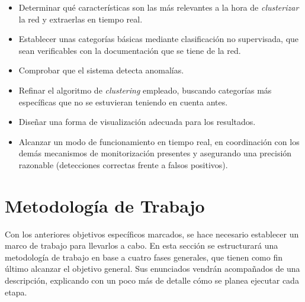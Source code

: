 \begin{itemize}

\item Determinar qué características son las más relevantes a la hora de \emph{clusterizar} la red y extraerlas en tiempo real.

\item Establecer unas categorías básicas mediante clasificación no supervisada, que sean verificables con la documentación que se tiene de la red.

\item Comprobar que el sistema detecta anomalías.

\item Refinar el algoritmo de \emph{clustering} empleado, buscando categorías más específicas que no se estuvieran teniendo en cuenta antes.

\item Diseñar una forma de visualización adecuada para los resultados.

\item Alcanzar un modo de funcionamiento en tiempo real, en coordinación con los demás mecanismos de monitorización presentes y asegurando una precisión razonable (detecciones correctas frente a falsos positivos).

\end{itemize}

\section{Metodología de Trabajo}\label{sec:metodologia}

Con los anteriores objetivos específicos marcados, se hace necesario establecer un marco de trabajo para llevarlos a cabo.
En esta sección se estructurará una metodología de trabajo en base a cuatro fases generales, que tienen como fin último alcanzar el objetivo general.
Sus enunciados vendrán acompañados de una descripción, explicando con un poco más de detalle cómo se planea ejecutar cada etapa.

